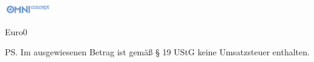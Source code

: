 \documentclass[a4paper]{scrlttr2}
\begin{document}
	\begin{letter}{\customerCompany \\ \customerName \\ 
	\customerStreet \\ \customerZIP \ \customerCity}
	
			\includegraphics[width=0.15\textwidth]{logo.png}			
			\opening{\invoiceSalutation}
			\invoiceText
		    \begin{invoice}{Euro}{0}
			    
		    \end{invoice}
		\ps Im ausgewiesenen Betrag ist gemäß § 19 UStG keine Umsatzsteuer enthalten.

		\closing{\invoiceClosing}
		\invoiceEnclosures
	\end{letter}
\end{document}
